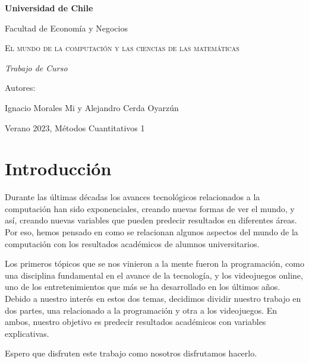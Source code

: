 \documentclass[11pt]{article}
\begin{document}
\begin{titlepage}

\begin{center}
{\bfseries\LARGE Universidad de Chile\par}
\vspace{1cm}
{\Large Facultad de Economía y Negocios \par}
\vspace{6cm}
{\scshape\Huge El mundo de la computación y las ciencias de las matemáticas\par}
\vspace{9cm}
{\itshape\Large Trabajo de Curso \par}
\vspace{2cm}
{\Large Autores: \par}
{\Large Ignacio Morales Mi y Alejandro Cerda Oyarzún \par}
\vspace{1cm}
{\Large Verano 2023, Métodos Cuantitativos 1 \par}
\end{center}

\end{titlepage}

\tableofcontents

\newpage

\section{Introducción}

Durante las últimas décadas los avances tecnológicos relacionados a la computación han sido exponenciales, creando nuevas formas de ver el mundo, y así, creando nuevas variables que pueden predecir resultados en diferentes áreas. Por eso, hemos pensado en como se relacionan algunos aspectos del mundo de la computación con los resultados académicos de alumnos universitarios. 

Los primeros tópicos que se nos vinieron a la mente fueron la programación, como una disciplina fundamental en el avance de la tecnología, y los videojuegos online, uno de los entretenimientos que más se ha desarrollado en los últimos años. Debido a nuestro interés en estos dos temas, decidimos dividir nuestro trabajo en dos partes, una relacionado a la programación y otra a los videojuegos. En ambos, nuestro objetivo es predecir resultados académicos con variables explicativas.

Espero que disfruten este trabajo como nosotros disfrutamos hacerlo.
\end{document}
